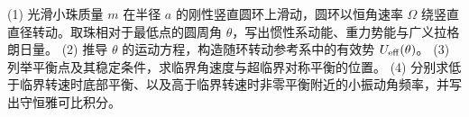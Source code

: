 (1) 光滑小珠质量 \(m\) 在半径 \(a\) 的刚性竖直圆环上滑动，圆环以恒角速率 \(\Omega\) 绕竖直直径转动。取珠相对于最低点的圆周角 \(\theta\)，写出惯性系动能、重力势能与广义拉格朗日量。
(2) 推导 \(\theta\) 的运动方程，构造随环转动参考系中的有效势 \(U_{\rm eff}(\theta)\)。
(3) 列举平衡点及其稳定条件，求临界角速度与超临界对称平衡的位置。
(4) 分别求低于临界转速时底部平衡、以及高于临界转速时非零平衡附近的小振动角频率，并写出守恒雅可比积分。
